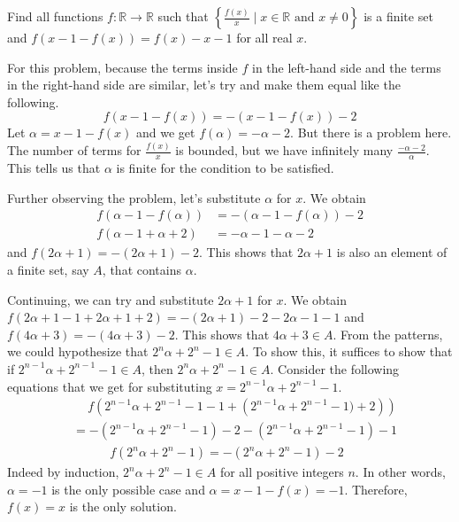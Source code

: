 \documentclass[../../../main.tex]{subfiles}
\begin{document}
\begin{problem}{}{}
Find all functions $f: \mathbb{R} \to \mathbb{R}$ such that
$\left\{ \frac{f(x)}{x} \mid x \in \mathbb{R} \text{ and } x \neq 0
\right\}$ is a finite set and $f(x - 1 - f(x)) = f(x) - x - 1$ for all
real $x$.
\end{problem}
\begin{solution}
For this problem, because the terms inside $f$ in the left-hand
side and the terms in the right-hand side are similar, let's try
and make them equal like the following.
\[
f(x - 1 - f(x)) = -(x - 1 - f(x)) - 2
\]
Let $\alpha = x - 1 - f(x)$ and we get $f(\alpha) = -\alpha - 2$.
But there is a problem here. The number of terms for $\frac{f(x)}{x}$
is bounded, but we have infinitely many $\frac{-\alpha - 2}{\alpha}$.
This tells us that $\alpha$ is finite for the condition to be
satisfied.

Further observing the problem, let's substitute $\alpha$ for $x$.
We obtain
\begin{align*}
    f(\alpha - 1 - f(\alpha))
    &= -(\alpha - 1 - f(\alpha)) - 2 \\
    f(\alpha - 1 + \alpha + 2) &= -\alpha - 1 - \alpha - 2
\end{align*}
and $f(2\alpha + 1) = -(2\alpha + 1) - 2$. This shows that
$2\alpha + 1$ is also an element of a finite set, say $A$,
that contains $\alpha$.

Continuing, we can try and substitute $2\alpha + 1$ for $x$.
We obtain $f(2\alpha + 1 - 1 + 2\alpha + 1 + 2) = -(2\alpha + 1) - 2
- 2\alpha - 1 - 1$ and $f(4\alpha + 3) = -(4\alpha + 3) - 2$.
This shows that $4\alpha + 3 \in A$. From the patterns, we could
hypothesize that $2^n \alpha + 2^n - 1 \in A$. To show this,
it suffices to show that if $2^{n-1} \alpha + 2^{n-1} - 1 \in A$,
then $2^n \alpha + 2^n - 1 \in A$. Consider the following equations
that we get for substituting $x = 2^{n-1} \alpha + 2^{n-1} - 1$.
\begin{align*}
    &\quad\ f \left(
        2^{n-1} \alpha + 2^{n-1} - 1 - 1
            + \left( 2^{n-1} \alpha + 2^{n-1} - 1) + 2 \right)
    \right) \\
    &= -\left( 2^{n-1} \alpha + 2^{n-1} - 1 \right) - 2
        - \left( 2^{n-1} \alpha + 2^{n-1} - 1 \right) - 1 \\
    &\qquad\quad
    f \left( 2^n \alpha + 2^n - 1 \right)
    = -\left( 2^n \alpha + 2^n - 1 \right) - 2
\end{align*}
Indeed by induction, $2^n \alpha + 2^n - 1 \in A$ for all positive
integers $n$. In other words, $\alpha = -1$ is the only possible
case and $\alpha = x - 1 - f(x) = -1$. Therefore, $f(x) = x$ is the
only solution.
\end{solution}
\end{document}
